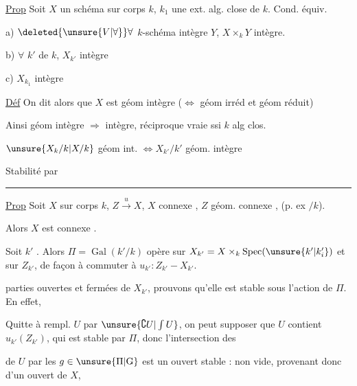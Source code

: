 \uline{Prop} Soit $X$ un schéma sur corps $k$, $k_1$ une ext. alg. close de $k$. Cond. équiv.

a) $\deleted{\unsure{V|\forall}}\forall$ $k$-schéma intègre $Y$, $X\times_k Y$ intègre.

b) $\forall$  $k'$ de $k$, $X_{k'}$ intègre

c)  $X_{k_1}$ intègre

\uline{Déf} On dit alors que $X$ est géom intègre ($\Longleftrightarrow$ géom irréd et géom réduit)

Ainsi géom intègre $\Rightarrow$ intègre, réciproque vraie ssi $k$ alg clos.

$\unsure{X_k/k|X/k}$ géom int. $\Longleftrightarrow X_{k'}/k'$ géom. intègre

Stabilité par 

\par\noindent\rule{.22\linewidth}{.4pt}\par
\uline{Prop} Soit $X$ sur corps $k$, $Z\xrightarrow{u}X$, $X$ connexe , $Z$ géom. connexe , (p. ex  $/k$).

\noindent\vrule\enspace Alors $X$ est  connexe .

Soit $k'$  . Alors $\Pi=\operatorname{Gal}(k'/k)$ opère sur $X_{k'}=X\times_k\operatorname{Spec}(\unsure{k'|k'_i})$ et sur $Z_{k'}$, de façon à commuter à $u_{k'}: Z_{k'} - X_{k'}$.

  parties ouvertes et fermées de $X_{k'}$,     prouvons qu'elle est stable sous l'action de $\Pi$. En effet,

 Quitte à rempl. $U$ par $\unsure{\complement U|\int U}$, on peut supposer que $U$ contient $u_{k'}(Z_{k'})$, qui est stable par $\Pi$, donc l'intersection  des

  de $U$ par les $g\in \unsure{\Pi|\mathrm{G}}$ est un ouvert stable  :  non vide, provenant donc d'un ouvert  de $X$, 

